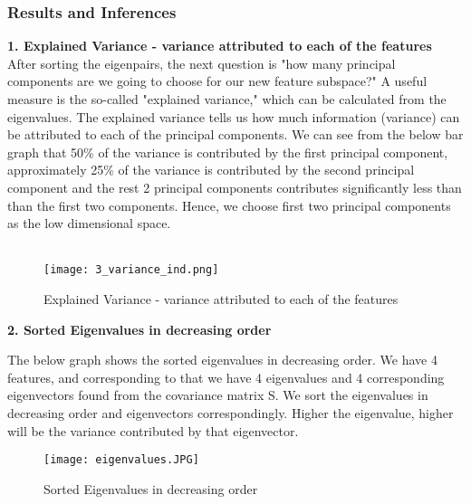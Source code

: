 \documentclass{article}
\begin{document}
\subsubsection {\color{brown} \textbf{Results and Inferences}}
\textbf{ 1. Explained Variance - variance attributed to each of the features} \\ 
       After sorting the eigenpairs, the next question is "how many principal components are we going to choose for our new feature subspace?" A useful measure is the so-called "explained variance," which can be calculated from the eigenvalues. The explained variance tells us how much information (variance) can be attributed to each of the principal components. We can see from the below bar graph that 50\% of the variance is contributed by the first principal component, approximately 25\% of the variance is contributed by the second principal component and the rest 2 principal components contributes significantly less than than the first two components. Hence, we choose first two principal components as the low dimensional space. \\ \\
       \begin{figure}[H]
       \centering
     \texttt{[image: 3\_variance\_ind.png]}
    \caption{Explained Variance - variance attributed to each of the features }
    \label{fig:Caption}
\end{figure}
\newpage

    \textbf{ 2. Sorted Eigenvalues in decreasing order} 
    \begin{itemize}
        
       The below graph shows the sorted eigenvalues in decreasing order. We have 4 features, and corresponding to that we have 4 eigenvalues and 4 corresponding eigenvectors found from the covariance matrix S. We sort the eigenvalues in decreasing order and eigenvectors correspondingly. Higher the eigenvalue, higher will be the variance contributed by that eigenvector. \\ 
      \begin{figure}[H]
      \centering
    \texttt{[image: eigenvalues.JPG]}
    \caption{ Sorted Eigenvalues in decreasing order  }
    \label{fig:Caption}
    \end{figure}
    \end{itemize}
    
\end{document}
